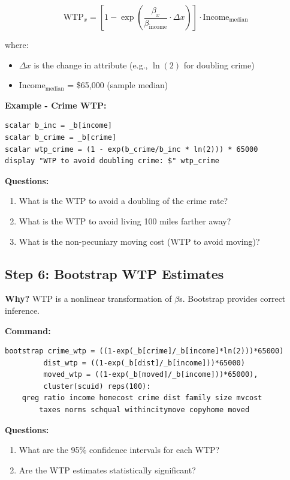 \documentclass[12pt]{article}
\begin{document}
$$\text{WTP}_x = \left[1 - \exp\left(\frac{\beta_x}{\beta_{\text{income}}} \cdot \Delta x\right)\right] \cdot \text{Income}_{\text{median}}$$

where:
\begin{itemize}
    \item $\Delta x$ is the change in attribute (e.g., $\ln(2)$ for doubling crime)
    \item Income$_{\text{median}}$ = \$65,000 (sample median)
\end{itemize}

\textbf{Example - Crime WTP:}
\begin{verbatim}
scalar b_inc = _b[income]
scalar b_crime = _b[crime]
scalar wtp_crime = (1 - exp(b_crime/b_inc * ln(2))) * 65000
display "WTP to avoid doubling crime: $" wtp_crime
\end{verbatim}

\textbf{Questions:}
\begin{enumerate}
    \item What is the WTP to avoid a doubling of the crime rate?
    \item What is the WTP to avoid living 100 miles farther away?
    \item What is the non-pecuniary moving cost (WTP to avoid moving)?
\end{enumerate}

\subsection{Step 6: Bootstrap WTP Estimates}

\textbf{Why?} WTP is a nonlinear transformation of $\beta$s. Bootstrap provides correct inference.

\textbf{Command:}
\begin{verbatim}
bootstrap crime_wtp = ((1-exp(_b[crime]/_b[income]*ln(2)))*65000)
         dist_wtp = ((1-exp(_b[dist]/_b[income]))*65000)
         moved_wtp = ((1-exp(_b[moved]/_b[income]))*65000),
         cluster(scuid) reps(100):
    qreg ratio income homecost crime dist family size mvcost 
        taxes norms schqual withincitymove copyhome moved
\end{verbatim}

\textbf{Questions:}
\begin{enumerate}
    \item What are the 95\% confidence intervals for each WTP?
    \item Are the WTP estimates statistically significant?
\end{enumerate}
\end{document}
